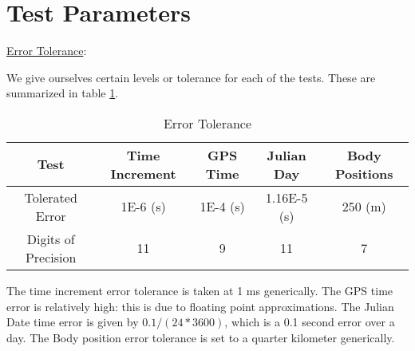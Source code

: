 \section{Test Parameters}

\underline{Error Tolerance}:

We give ourselves certain levels or tolerance for each of the tests. These are summarized in table \ref{tab:errortol}. 

\begin{table}[htbp]
    \caption{Error Tolerance}
   \label{tab:errortol}
        \centering \fontsize{10}{10}\selectfont
   \begin{tabular}{| c | c | c | c | c |} %
      \hline
      Test   & Time Increment &GPS Time& Julian Day & Body Positions \\
      \hline
      Tolerated Error & 1E-6 (s) & 1E-4 (s) & 1.16E-5 (s) & 250 (m) \\
      \hline
      Digits of Precision & 11 & 9 & 11 & 7 \\
      \hline
   \end{tabular}
\end{table}

The time increment error tolerance is taken at 1 ms generically. The GPS time error is relatively high: this is due to floating point approximations. The Julian Date time error is given by $0.1/(24*3600)$, which is a 0.1 second error over a day.  The Body position error tolerance is set to a quarter kilometer generically. 


